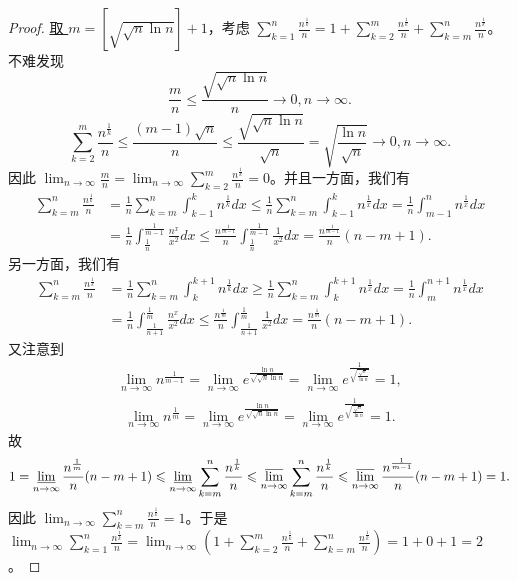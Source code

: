 \documentclass[../../main.tex]{subfiles}
\begin{document}
\begin{proof}
\hyperlink{取m的原因}{取 \(m = [\sqrt{\sqrt{n}\ln n}]+1\)}，考虑 \(\sum_{k = 1}^n\frac{n^{\frac{1}{k}}}{n}=1+\sum_{k = 2}^m\frac{n^{\frac{1}{k}}}{n}+\sum_{k = m}^n\frac{n^{\frac{1}{k}}}{n}\)。不难发现
\[
\frac{m}{n}\leqslant \frac{\sqrt{\sqrt{n}\ln n}}{n}\rightarrow 0,n\rightarrow \infty.
\]
\[
\sum_{k = 2}^m\frac{n^{\frac{1}{k}}}{n}\leqslant \frac{(m - 1)\sqrt{n}}{n}\leqslant \frac{\sqrt{\sqrt{n}\ln n}}{\sqrt{n}}=\sqrt{\frac{\ln n}{\sqrt{n}}}\rightarrow 0,n\rightarrow \infty.
\]
因此 \(\lim_{n\rightarrow \infty}\frac{m}{n}=\lim_{n\rightarrow \infty}\sum_{k = 2}^m\frac{n^{\frac{1}{k}}}{n}=0\)。并且一方面，我们有
\begin{align*}
\sum_{k=m}^n{\frac{n^{\frac{1}{k}}}{n}}&=\frac{1}{n}\sum_{k=m}^n{\int_{k-1}^k{n^{\frac{1}{k}}dx}}\leqslant \frac{1}{n}\sum_{k=m}^n{\int_{k-1}^k{n^{\frac{1}{x}}dx}}=\frac{1}{n}\int_{m-1}^n{n^{\frac{1}{x}}dx}
\\
&=\frac{1}{n}\int_{\frac{1}{n}}^{\frac{1}{m-1}}{\frac{n^x}{x^2}dx}\leqslant \frac{n^{\frac{1}{m-1}}}{n}\int_{\frac{1}{n}}^{\frac{1}{m-1}}{\frac{1}{x^2}dx}=\frac{n^{\frac{1}{m-1}}}{n}\left( n-m+1 \right) .
\end{align*}
另一方面，我们有
\begin{align*}
\sum_{k=m}^n{\frac{n^{\frac{1}{k}}}{n}}&=\frac{1}{n}\sum_{k=m}^n{\int_k^{k+1}{n^{\frac{1}{k}}dx}}\geqslant \frac{1}{n}\sum_{k=m}^n{\int_k^{k+1}{n^{\frac{1}{x}}dx}}=\frac{1}{n}\int_m^{n+1}{n^{\frac{1}{x}}dx}
\\
&=\frac{1}{n}\int_{\frac{1}{n+1}}^{\frac{1}{m}}{\frac{n^x}{x^2}dx}\leqslant \frac{n^{\frac{1}{m}}}{n}\int_{\frac{1}{n+1}}^{\frac{1}{m}}{\frac{1}{x^2}dx}=\frac{n^{\frac{1}{m}}}{n}\left( n-m+1 \right) .
\end{align*}
又注意到
\begin{align*}
\lim_{n\rightarrow \infty}n^{\frac{1}{m - 1}}=\lim_{n\rightarrow \infty}e^{\frac{\ln n}{\sqrt{\sqrt{n}\ln n}}}
=\lim_{n\rightarrow \infty}e^{\frac{1}{\sqrt{\frac{\sqrt{n}}{\ln n}}}}
=1,
\end{align*}
\begin{align*}
\lim_{n\rightarrow \infty}n^{\frac{1}{m}}=\lim_{n\rightarrow \infty}e^{\frac{\ln n}{\sqrt{\sqrt{n}\ln n}}}
=\lim_{n\rightarrow \infty}e^{\frac{1}{\sqrt{\frac{\sqrt{n}}{\ln n}}}}
=1.
\end{align*}
故
\[
1=\varliminf_{n\rightarrow \infty}\frac{n^{\frac{1}{m}}}{n}(n - m + 1)\leqslant \varliminf_{n\rightarrow \infty}\sum_{k = m}^n\frac{n^{\frac{1}{k}}}{n}\leqslant \varlimsup_{n\rightarrow \infty}\sum_{k = m}^n\frac{n^{\frac{1}{k}}}{n}\leqslant \varlimsup_{n\rightarrow \infty}\frac{n^{\frac{1}{m - 1}}}{n}(n - m + 1)=1.
\]
因此 \(\lim_{n\rightarrow \infty}\sum_{k = m}^n\frac{n^{\frac{1}{k}}}{n}=1\)。于是 \(\lim_{n\rightarrow \infty}\sum_{k = 1}^n\frac{n^{\frac{1}{k}}}{n}=\lim_{n\rightarrow \infty}\left(1+\sum_{k = 2}^m\frac{n^{\frac{1}{k}}}{n}+\sum_{k = m}^n\frac{n^{\frac{1}{k}}}{n}\right)=1 + 0+1 = 2\)。
\end{proof}
\end{document}
